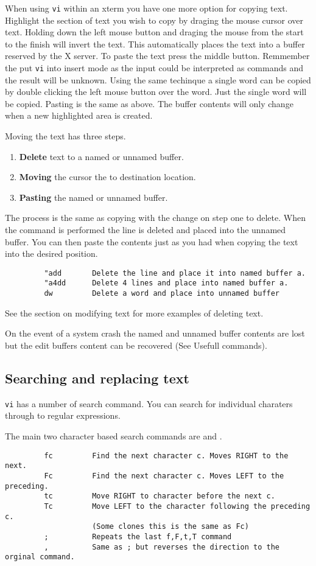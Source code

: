 When using {\tt vi} within an xterm you have one more option for copying text.
Highlight the section of text you wish to copy by draging the mouse cursor
over text.
Holding down the left mouse button and draging the mouse from the start
to the finish will invert the text. This automatically places the text into 
a buffer reserved by the X server. To paste the text press the middle button.
Remmember the put {\tt vi} into insert mode as the input could be interpreted
as commands and the result will be unknown. Using the same techinque a single
word can be copied by double clicking the left mouse button over the word. Just
the single word will be copied. Pasting is the same as above. The buffer 
contents will only change when a new highlighted area is created.

Moving the text has three steps.
\begin{enumerate}
\item {\bf Delete} text to a named or unnamed buffer.
\item {\bf Moving} the cursor the to destination location.
\item {\bf Pasting} the named or unnamed buffer.
\end{enumerate}

The process is the same as copying with the change on step one to delete.
When the command  is performed the line is deleted and placed into
the unnamed buffer. You can then paste the contents just as you had
when copying the text into the desired position.

\begin{verbatim}
         "add       Delete the line and place it into named buffer a.
         "a4dd      Delete 4 lines and place into named buffer a.
         dw         Delete a word and place into unnamed buffer
\end{verbatim}
See the section on modifying text for more examples of deleting text.

On the event of a system crash the named and unnamed buffer contents are
lost but the edit buffers content can be recovered (See Usefull commands).

\subsection{Searching and replacing text}

{\tt vi} has a number of search command. You can search for individual
charaters through to regular expressions.

The main two character based search commands are  and .
\begin{verbatim}
         fc         Find the next character c. Moves RIGHT to the next.
         Fc         Find the next character c. Moves LEFT to the preceding.
         tc         Move RIGHT to character before the next c.
         Tc         Move LEFT to the character following the preceding c.
                    (Some clones this is the same as Fc)
         ;          Repeats the last f,F,t,T command
         ,          Same as ; but reverses the direction to the orginal command.
\end{verbatim}


